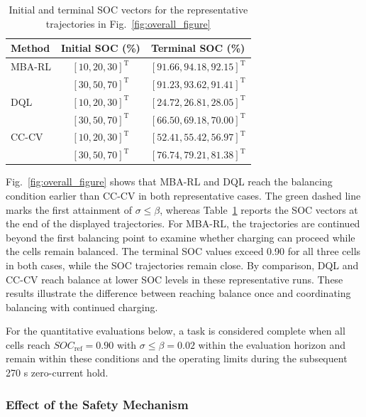 \documentclass[10pt,journal,letterpaper]{IEEEtran}
\begin{document}
\begin{table}[!t]
\centering
\caption{Initial and terminal SOC vectors for the representative trajectories in Fig.~\ref{fig:overall_figure}}
\label{tab:soc_vectors}
\scriptsize
\setlength{\tabcolsep}{2pt}
\begin{tabular}{@{}lcc@{}}
\toprule
Method & Initial SOC (\%) & Terminal SOC (\%) \\
\midrule
MBA-RL & $[10,20,30]^{\mathrm T}$ & $[91.66,94.18,92.15]^{\mathrm T}$ \\
 & $[30,50,70]^{\mathrm T}$ & $[91.23,93.62,91.41]^{\mathrm T}$ \\
DQL & $[10,20,30]^{\mathrm T}$ & $[24.72,26.81,28.05]^{\mathrm T}$ \\
 & $[30,50,70]^{\mathrm T}$ & $[66.50,69.18,70.00]^{\mathrm T}$ \\
CC-CV & $[10,20,30]^{\mathrm T}$ & $[52.41,55.42,56.97]^{\mathrm T}$ \\
 & $[30,50,70]^{\mathrm T}$ & $[76.74,79.21,81.38]^{\mathrm T}$ \\
\bottomrule
\end{tabular}
\end{table}

Fig.~\ref{fig:overall_figure} shows that MBA-RL and DQL reach the balancing condition earlier than CC-CV in both representative cases. The green dashed line marks the first attainment of $\sigma\leq\beta$, whereas Table~\ref{tab:soc_vectors} reports the SOC vectors at the end of the displayed trajectories. For MBA-RL, the trajectories are continued beyond the first balancing point to examine whether charging can proceed while the cells remain balanced. The terminal SOC values exceed 0.90 for all three cells in both cases, while the SOC trajectories remain close. By comparison, DQL and CC-CV reach balance at lower SOC levels in these representative runs. These results illustrate the difference between reaching balance once and coordinating balancing with continued charging.

For the quantitative evaluations below, a task is considered complete when all cells reach $SOC_{\mathrm{ref}}=0.90$ with $\sigma\leq\beta=0.02$ within the evaluation horizon and remain within these conditions and the operating limits during the subsequent 270 s zero-current hold.

\subsubsection{Effect of the Safety Mechanism}
\end{document}
